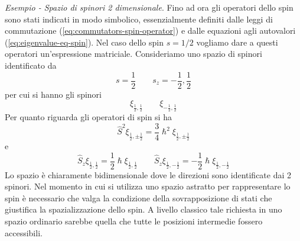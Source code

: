 \emph{Esempio - Spazio di spinori 2 dimensionale}.
Fino ad ora gli operatori dello spin sono stati indicati in modo simbolico, essenzialmente definiti dalle leggi di
commutazione (\ref{eq:commutators-spin-operator}) e dalle equazioni agli autovalori (\ref{eq:eigenvalue-eq-spin}).
Nel caso dello spin $s=1/2$ vogliamo dare a questi operatori un’espressione matriciale.
Consideriamo uno spazio di spinori identificato da \[
                                                       s = \frac{1}{2} \qquad s_{z} = - \frac{1}{2} , \frac{1}{2}
\] per cui si hanno gli spinori \[
                                    \xi_{\frac{1}{2}, \frac{1}{2}} \qquad \xi_{- \frac{1}{2}, \frac{1}{2}}
\] Per quanto riguarda gli operatori di spin si ha \[
                                                       \hat{S}^{2} \xi_{\frac{1}{2}, \pm \frac{1}{2}} = \frac{3}{4} \hslash^{2} \xi_{\frac{1}{2}, \pm \frac{1}{2}}
\] e \[
         \hat{S}_{z} \xi_{\frac{1}{2}, \frac{1}{2}} = \frac{1}{2} \hslash \xi_{\frac{1}{2}, \frac{1}{2}} \qquad
         \hat{S}_{z} \xi_{\frac{1}{2}, - \frac{1}{2}} = - \frac{1}{2} \hslash \xi_{\frac{1}{2}, -\frac{1}{2}}
\] Lo spazio è chiaramente bidimensionale dove le direzioni sono
identificate dai 2 spinori.
Nel momento in cui si utilizza uno spazio astratto per rappresentare lo
spin è necessario che valga la condizione della sovrapposizione di stati
che giustifica la spazializzazione dello spin.
A livello classico tale
richiesta in uno spazio ordinario sarebbe quella che tutte le posizioni
intermedie fossero accessibili.

